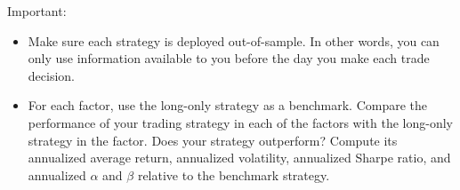 \documentclass[11pt]{article}
\theoremstyle{plain} %
\theoremstyle{remark}
\begin{document}
Important:

\begin{itemize}
  \item Make sure each strategy is deployed out-of-sample. In other words, you
  can only use information available to you before the day you make each trade
  decision.
  \item For each factor, use the long-only strategy as a benchmark. Compare the
  performance of your trading strategy in each of the factors with the long-only
  strategy in the factor. Does your strategy outperform? Compute its annualized
  average return, annualized volatility, annualized Sharpe ratio, and annualized
  \(\alpha\) and \(\beta\) relative to the benchmark strategy.
\end{itemize}
\end{document}
